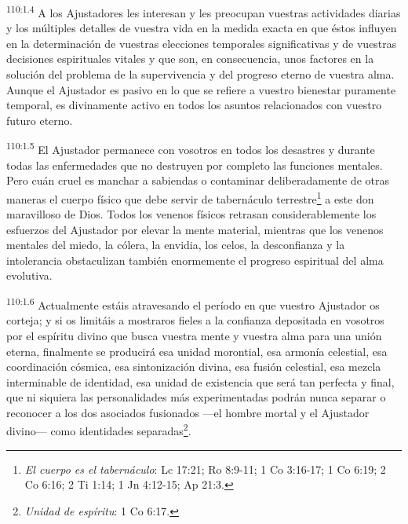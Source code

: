 \documentclass[twoside, 11pt]{book}
\begin{document}
\par
\textsuperscript{110:1.4} A los Ajustadores les interesan y les preocupan vuestras actividades diarias y los múltiples detalles de vuestra vida en la medida exacta en que éstos influyen en la determinación de vuestras elecciones temporales significativas y de vuestras decisiones espirituales vitales y que son, en consecuencia, unos factores en la solución del problema de la supervivencia y del progreso eterno de vuestra alma. Aunque el Ajustador es pasivo en lo que se refiere a vuestro bienestar puramente temporal, es divinamente activo en todos los asuntos relacionados con vuestro futuro eterno.

\par
\textsuperscript{110:1.5} El Ajustador permanece con vosotros en todos los desastres y durante todas las enfermedades que no destruyen por completo las funciones mentales. Pero cuán cruel es manchar a sabiendas o contaminar deliberadamente de otras maneras el cuerpo físico que debe servir de tabernáculo terrestre\footnote{\textit{El cuerpo es el tabernáculo}: Lc 17:21; Ro 8:9-11; 1 Co 3:16-17; 1 Co 6:19; 2 Co 6:16; 2 Ti 1:14; 1 Jn 4:12-15; Ap 21:3.} a este don maravilloso de Dios. Todos los venenos físicos retrasan considerablemente los esfuerzos del Ajustador por elevar la mente material, mientras que los venenos mentales del miedo, la cólera, la envidia, los celos, la desconfianza y la intolerancia obstaculizan también enormemente el progreso espiritual del alma evolutiva.

\par
\textsuperscript{110:1.6} Actualmente estáis atravesando el período en que vuestro Ajustador os corteja; y si os limitáis a mostraros fieles a la confianza depositada en vosotros por el espíritu divino que busca vuestra mente y vuestra alma para una unión eterna, finalmente se producirá esa unidad morontial, esa armonía celestial, esa coordinación cósmica, esa sintonización divina, esa fusión celestial, esa mezcla interminable de identidad, esa unidad de existencia que será tan perfecta y final, que ni siquiera las personalidades más experimentadas podrán nunca separar o reconocer a los dos asociados fusionados ---el hombre mortal y el Ajustador divino--- como identidades separadas\footnote{\textit{Unidad de espíritu}: 1 Co 6:17.}.
\end{document}
